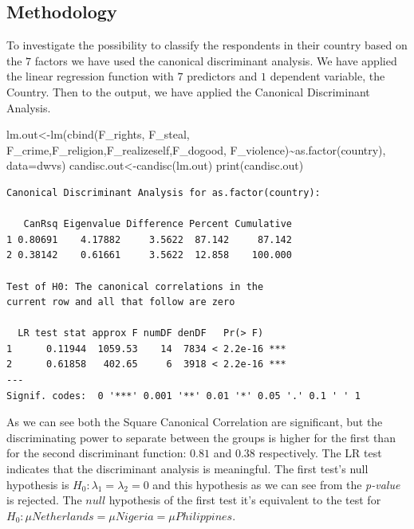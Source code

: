\documentclass[
  11pt,
]{article}
\newenvironment{Shaded}{\begin{snugshade}}{\end{snugshade}}
\newcommand{\AttributeTok}[1]{\textcolor[rgb]{0.77,0.63,0.00}{#1}}
\newcommand{\FunctionTok}[1]{\textcolor[rgb]{0.00,0.00,0.00}{#1}}
\newcommand{\NormalTok}[1]{#1}
\newcommand{\OtherTok}[1]{\textcolor[rgb]{0.56,0.35,0.01}{#1}}
\newcommand{\SpecialCharTok}[1]{\textcolor[rgb]{0.00,0.00,0.00}{#1}}
\begin{document}
\hypertarget{methodology}{%
\subsection{Methodology}\label{methodology}}

To investigate the possibility to classify the respondents in their country based on the \(7\) factors we have used the canonical discriminant analysis. We have applied the linear regression function with \(7\) predictors and \(1\) dependent variable, the Country. Then to the output, we have applied the Canonical Discriminant Analysis.

\begin{Shaded}
\begin{Highlighting}[]
\NormalTok{lm.out}\OtherTok{\textless{}{-}}\FunctionTok{lm}\NormalTok{(}\FunctionTok{cbind}\NormalTok{(F\_rights, F\_steal, F\_crime,F\_religion,F\_realizeself,F\_dogood,}
\NormalTok{                 F\_violence)}\SpecialCharTok{\textasciitilde{}}\FunctionTok{as.factor}\NormalTok{(country), }\AttributeTok{data=}\NormalTok{dwvs)}
\NormalTok{candisc.out}\OtherTok{\textless{}{-}}\FunctionTok{candisc}\NormalTok{(lm.out)}
\FunctionTok{print}\NormalTok{(candisc.out)}
\end{Highlighting}
\end{Shaded}

\begin{verbatim}
Canonical Discriminant Analysis for as.factor(country):

   CanRsq Eigenvalue Difference Percent Cumulative
1 0.80691    4.17882     3.5622  87.142     87.142
2 0.38142    0.61661     3.5622  12.858    100.000

Test of H0: The canonical correlations in the 
current row and all that follow are zero

  LR test stat approx F numDF denDF   Pr(> F)    
1      0.11944  1059.53    14  7834 < 2.2e-16 ***
2      0.61858   402.65     6  3918 < 2.2e-16 ***
---
Signif. codes:  0 '***' 0.001 '**' 0.01 '*' 0.05 '.' 0.1 ' ' 1
\end{verbatim}

As we can see both the Square Canonical Correlation are significant, but the discriminating power to separate between the groups is higher for the first than for the second discriminant function: \(0.81\) and \(0.38\) respectively.
The LR test indicates that the discriminant analysis is meaningful. The first test's null hypothesis is \(H_{0}: \lambda_{1}=\lambda_{2}=0\) and this hypothesis as we can see from the \emph{p-value} is rejected. The \(null\) hypothesis of the first test it's equivalent to the test for \(H_{0}: \mu Netherlands = \mu Nigeria = \mu Philippines\).
\end{document}
